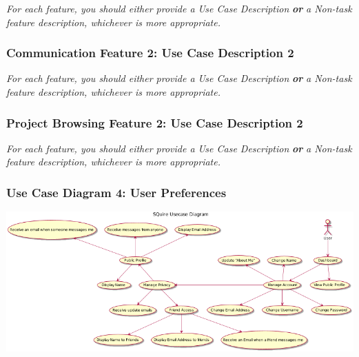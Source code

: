 \documentclass[twoside,letterpaper]{article}
\begin{document}
{\color{black}
	\foreignlanguage{english}{\textit{For each feature, you should either provide a Use Case Description
		}}\foreignlanguage{english}{\textbf{\textit{or}}}\foreignlanguage{english}{\textit{ a Non-task feature description,
		whichever is more appropriate.}}}
\newpage

\subsubsection[Communication Feature 2: Use Case Description 2]{\rmfamily\bfseries\color{black}
	Communication Feature 2: Use Case Description 2}
\hypertarget{RefHeading22059017292}{}
\bigskip

{\color{black}
	\foreignlanguage{english}{\textit{For each feature, you should either provide a Use Case Description
		}}\foreignlanguage{english}{\textbf{\textit{or}}}\foreignlanguage{english}{\textit{ a Non-task feature description,
		whichever is more appropriate.}}}
\newpage

\subsubsection[Project Browsing Feature 2: Use Case Description 2]{\rmfamily\bfseries\color{black}
	Project Browsing Feature 2: Use Case Description 2}
\hypertarget{RefHeading22059017292}{}
\bigskip

{\color{black}
	\foreignlanguage{english}{\textit{For each feature, you should either provide a Use Case Description
		}}\foreignlanguage{english}{\textbf{\textit{or}}}\foreignlanguage{english}{\textit{ a Non-task feature description,
		whichever is more appropriate.}}}
\newpage

\subsubsection[Use Case Diagram 4: User Preferences]{\rmfamily\bfseries\color{black}
	Use Case Diagram 4: User Preferences}

\includegraphics[width=\textwidth]{images/UseCases/UserPreferences}
\end{document}
